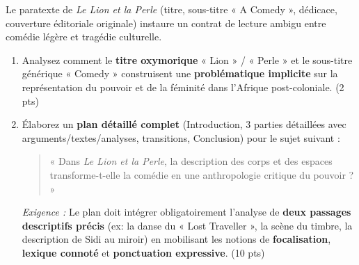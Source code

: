 \documentclass[11pt]{article}
\begin{document}
\begin{exercice}
Le paratexte de \textit{Le Lion et la Perle} (titre, sous-titre « A Comedy », dédicace, couverture éditoriale originale) instaure un contrat de lecture ambigu entre comédie légère et tragédie culturelle.

\begin{enumerate}
    \item Analysez comment le \textbf{titre oxymorique} « Lion » / « Perle » et le sous-titre générique « Comedy » construisent une \textbf{problématique implicite} sur la représentation du pouvoir et de la féminité dans l'Afrique post-coloniale. (2 pts)
    \item Élaborez un \textbf{plan détaillé complet} (Introduction, 3 parties détaillées avec arguments/textes/analyses, transitions, Conclusion) pour le sujet suivant : 
    \begin{quote}
    « Dans \textit{Le Lion et la Perle}, la description des corps et des espaces transforme-t-elle la comédie en une anthropologie critique du pouvoir ? »
    \end{quote}
    \textit{Exigence :} Le plan doit intégrer obligatoirement l'analyse de \textbf{deux passages descriptifs précis} (ex: la danse du « Lost Traveller », la scène du timbre, la description de Sidi au miroir) en mobilisant les notions de \textbf{focalisation}, \textbf{lexique connoté} et \textbf{ponctuation expressive}. (10 pts)
\end{enumerate}
\end{exercice}
\end{document}
